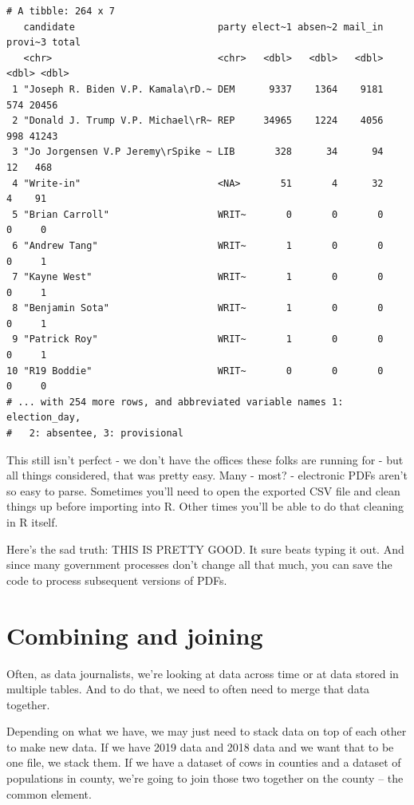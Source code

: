 \documentclass[
  letterpaper,
  DIV=11,
  numbers=noendperiod]{scrreprt}
\begin{document}
\begin{verbatim}
# A tibble: 264 x 7
   candidate                         party elect~1 absen~2 mail_in provi~3 total
   <chr>                             <chr>   <dbl>   <dbl>   <dbl>   <dbl> <dbl>
 1 "Joseph R. Biden V.P. Kamala\rD.~ DEM      9337    1364    9181     574 20456
 2 "Donald J. Trump V.P. Michael\rR~ REP     34965    1224    4056     998 41243
 3 "Jo Jorgensen V.P Jeremy\rSpike ~ LIB       328      34      94      12   468
 4 "Write-in"                        <NA>       51       4      32       4    91
 5 "Brian Carroll"                   WRIT~       0       0       0       0     0
 6 "Andrew Tang"                     WRIT~       1       0       0       0     1
 7 "Kayne West"                      WRIT~       1       0       0       0     1
 8 "Benjamin Sota"                   WRIT~       1       0       0       0     1
 9 "Patrick Roy"                     WRIT~       1       0       0       0     1
10 "R19 Boddie"                      WRIT~       0       0       0       0     0
# ... with 254 more rows, and abbreviated variable names 1: election_day,
#   2: absentee, 3: provisional
\end{verbatim}

This still isn't perfect - we don't have the offices these folks are
running for - but all things considered, that was pretty easy. Many -
most? - electronic PDFs aren't so easy to parse. Sometimes you'll need
to open the exported CSV file and clean things up before importing into
R. Other times you'll be able to do that cleaning in R itself.

Here's the sad truth: THIS IS PRETTY GOOD. It sure beats typing it out.
And since many government processes don't change all that much, you can
save the code to process subsequent versions of PDFs.


\hypertarget{combining-and-joining}{%
\chapter{Combining and joining}\label{combining-and-joining}}

Often, as data journalists, we're looking at data across time or at data
stored in multiple tables. And to do that, we need to often need to
merge that data together.

Depending on what we have, we may just need to stack data on top of each
other to make new data. If we have 2019 data and 2018 data and we want
that to be one file, we stack them. If we have a dataset of cows in
counties and a dataset of populations in county, we're going to join
those two together on the county -- the common element.
\end{document}
